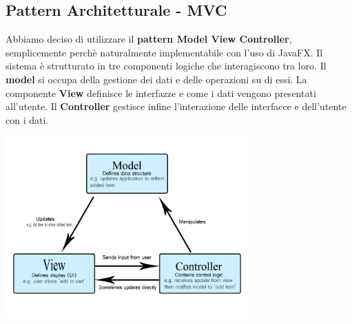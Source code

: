 \documentclass{article}
\begin{document}
\subsection{Pattern Architetturale - MVC}
Abbiamo deciso di utilizzare il \textbf{pattern Model View Controller}, semplicemente perchè naturalmente implementabile con l'uso di JavaFX. Il sistema è strutturato in tre componenti logiche che interagiscono tra loro. Il \textbf{model} si occupa della gestione dei dati e delle operazioni su di essi. La componente \textbf{View} definisce le interfazze e come i dati vengono presentati all'utente. Il \textbf{Controller} 
gestisce infine l'interazione delle interfacce e dell'utente con i dati.
\begin{center}
    \includegraphics[width=0.70\textwidth]{pictures/mvc.png}
\end{center}
		
\newpage
\end{document}
